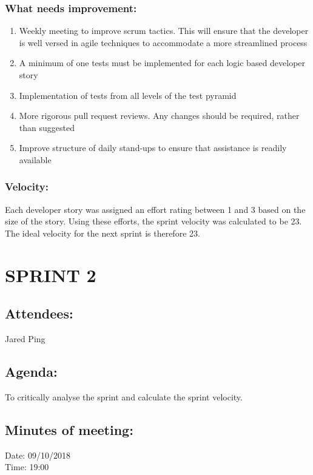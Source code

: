\documentclass[10pt,onecolumn]{witseiepaper}
\begin{document}
\subsubsection*{What needs improvement:}
\begin{enumerate}
	\item Weekly meeting to improve scrum tactics. This will ensure that the developer is well versed in agile techniques to accommodate a more streamlined process
	\item A minimum of one tests must be implemented for each logic based developer story 
	\item Implementation of tests from all levels of the test pyramid
	\item More rigorous pull request reviews. Any changes should be required, rather than suggested
	\item Improve structure of daily stand-ups to ensure that assistance is readily available 
\end{enumerate}

\subsubsection*{Velocity:}
Each developer story was assigned an effort rating between 1 and 3 based on the size of the story. Using these efforts, the sprint velocity was calculated to be 23. The ideal velocity for the next sprint is therefore 23.
\newpage
\section*{SPRINT 2}
\subsection*{Attendees:}
Jared Ping

\subsection*{Agenda:} 
To critically analyse the sprint and calculate the sprint velocity.

\subsection*{Minutes of meeting:}
Date: 09/10/2018 \\
Time: 19:00
\end{document}
